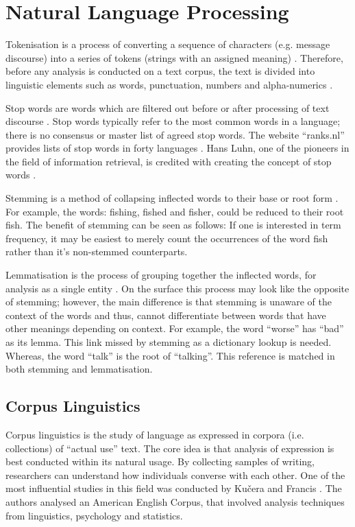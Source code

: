 \section{Natural Language Processing}

Tokenisation is a process of converting a sequence of characters (e.g. message discourse) into a series of tokens (strings with an assigned meaning) \cite{jurafsky2014speech}. Therefore, before any analysis is conducted on a text corpus, the text is divided into linguistic elements such as words, punctuation, numbers and alpha-numerics \cite{webster1992tokenization}. 

Stop words are words which are filtered out before or after processing of text discourse \cite{leskovec2014mining}. Stop words typically refer to the most common words in a language; there is no consensus or master list of agreed stop words. The website ``ranks.nl'' provides lists of stop words in forty languages \cite{ranknl}. Hans Luhn, one of the pioneers in the field of information retrieval, is credited with creating the concept of stop words \cite{luhn1960key}.

Stemming is a method of collapsing inflected words to their base or root form \cite{lovins1968development}. For example, the words: fishing, fished and fisher, could be reduced to their root fish. The benefit of stemming can be seen as follows: If one is interested in term frequency, it may be easiest to merely count the occurrences of the word fish rather than it's non-stemmed counterparts.

Lemmatisation is the process of grouping together the inflected words, for analysis as a single entity \cite{manning1995introduction}. On the surface this process may look like the opposite of stemming; however, the main difference is that stemming is unaware of the context of the words and thus, cannot differentiate between words that have other meanings depending on context. For example, the word ``worse''  has ``bad'' as its lemma. This link missed by stemming as a dictionary lookup is needed. Whereas, the word ``talk'' is the root of ``talking''. This reference is matched in both stemming and lemmatisation.

\subsection{Corpus Linguistics}

Corpus linguistics is the study of language as expressed in corpora (i.e. collections) of ``actual use'' text. The core idea is that analysis of expression is best conducted within its natural usage. By collecting samples of writing, researchers can understand how individuals converse with each other. One of the most influential studies in this field was conducted by Ku{\v{c}}era and Francis \cite{kuvcera1967computational}. The authors analysed an American English Corpus, that involved analysis techniques from linguistics, psychology and statistics.

